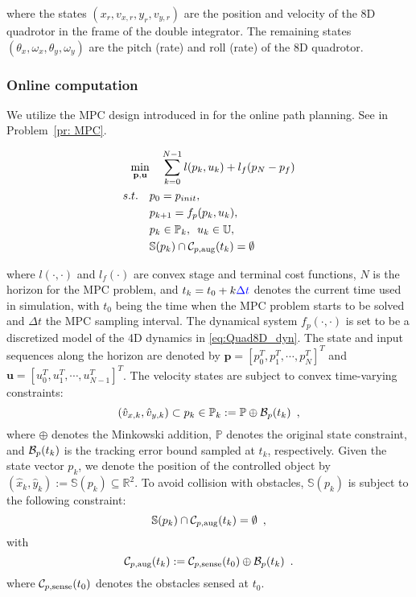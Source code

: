 where the states $(x_r,v_{x,r},y_r,v_{y,r})$ are the position and velocity of the 8D quadrotor in the frame of the double integrator. The remaining states $(\theta_x,\omega_x,\theta_y,\omega_y)$ are the pitch (rate) and roll (rate) of the 8D quadrotor.


\subsubsection{Online computation}
%
We utilize the MPC design introduced in \cite{Zhang2017} for the online path planning. See in Problem~\ref{pr: MPC}.
%
\begin{problem}\label{pr: MPC}
\begin{align*}
\min_{\mathbf{p},\mathbf{u}}  & \quad \sum^{N-1}_{k=0} l(p_k,u_k) + l_f(p_N-p_f)  \\
s.t. \quad & p_0 = p_{init},\\
&p_{k+1} = f_p(p_k,u_k),\\
& p_k \in \mathbb{P}_k ,\enspace u_k \in \mathbb{U},\\
& \mathbb{S}(p_k)\cap\mathcal C_{p,\text{aug}}(t_k) = \emptyset
\end{align*}
\end{problem}
where $l(\cdot,\cdot)$ and $l_f(\cdot)$ are convex stage and terminal cost functions, $N$ is the horizon for the MPC problem, and $t_k = t_0 + k \textcolor{blue}{\Delta t}$ denotes the current time used in simulation, with $t_0$ being the time when the MPC problem starts to be solved and $\Delta t$ the MPC sampling interval. The dynamical system $f_p(\cdot,\cdot)$ is set to be a discretized model of the 4D dynamics in \eqref{eq:Quad8D_dyn}. The state and input sequences along the horizon  are denoted by $\mathbf{p}=[p^{T}_0,p^{T}_1,\cdots,p^{T}_N]^{T}$ and $\mathbf{u}=[u^{T}_0,u^{T}_1,\cdots,u^{T}_{N-1}]^{T}$. The velocity states are subject to convex time-varying constraints:
%
\begin{equation}
(\hat v_{x,k},\hat v_{y,k}) \subset p_k \in \mathbb{P}_k :=\mathbb{P}\oplus\mathcal B_p(t_k) \enspace ,
\end{equation}
%
where $\oplus$ denotes the Minkowski addition, $\mathbb{P}$ denotes the original state constraint, and $\mathcal B_p(t_k)$ is the tracking error bound sampled at $t_k$, respectively. Given the state vector $p_k$, we denote the position of the controlled object by $(\hat x_k,\hat y_k) := \mathbb{S}(p_k)\subseteq \mathbb{R}^{2}$. To avoid collision with obstacles, $\mathbb{S}(p_k)$ is subject to the following constraint: 
%
\begin{equation}
\mathbb{S}(p_k)\cap\mathcal C_{p,\text{aug}}(t_k) = \emptyset \enspace ,
\end{equation}
%
with 
%
\begin{equation}
\mathcal C_{p,\text{aug}}(t_k) := \mathcal C_{p,\text{sense}}(t_0)\oplus\mathcal B_p(t_k) \enspace .
\end{equation}
%
where $\mathcal C_{p,\text{sense}}(t_0)$ denotes the obstacles sensed at $t_0$.

